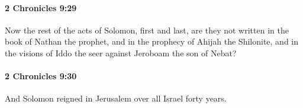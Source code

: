 		\paragraph{2 Chronicles 9:29} %
			\label{2CHRONICLES-9-29}

			Now the rest of the acts of Solomon, first and last, are they not written in the book of Nathan the prophet, and in the prophecy of Ahijah the Shilonite, and in the visions of Iddo the seer against Jeroboam the son of Nebat?


		\paragraph{2 Chronicles 9:30} %
			\label{2CHRONICLES-9-30}

			And Solomon reigned in Jerusalem over all Israel forty years.


